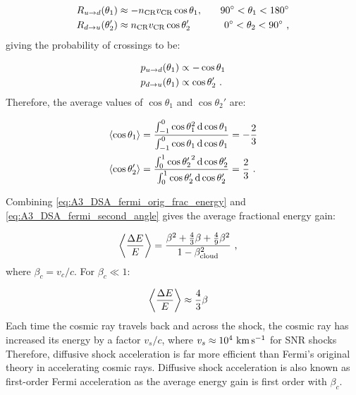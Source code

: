 \begin{alignat}{2}
    R_{u\rightarrow d}\qty(\theta_1)&\approx-n_\text{CR}v_\text{CR}\cos\theta_1,\quad &\ang{90}<\theta_1<\ang{180} \label{eq:ASA_DSA_rate_ud} \\
    R_{d\rightarrow u}\qty(\theta_2')&\approx n_\text{CR}v_\text{CR}\cos\theta_2'\quad&\ang{0}<\theta_2<\ang{90} \text{ ,}
\end{alignat}
\noindent giving the probability of crossings to be:

\begin{equation}
    \begin{aligned}
        p_{u\rightarrow d}\qty(\theta_1)&\propto -\cos\theta_1 \\
        p_{d\rightarrow u}\qty(\theta_1)&\propto \cos\theta_2'  \text{ .}
    \end{aligned}
\end{equation}
\noindent Therefore, the average values of $\cos\theta_1$ and $\cos\theta_2'$ are:

\begin{equation}
    \begin{aligned}
    \left\langle \cos\theta_1 \right\rangle&=\frac{\int_{-1}^{0} \cos\theta_1^2\dd{\cos\theta_1}}{\int_{-1}^{0}\cos\theta_1 \dd{\cos\theta_1}}=-\frac{2}{3} \\
    \left\langle \cos\theta_2' \right\rangle&=\frac{\int_{0}^{1} {\cos\theta_2'}^2\dd{\cos\theta_2'}}{\int_{0}^{1}\cos\theta_2' \dd{\cos\theta_2'}}=\frac{2}{3}\text{ .}
    \end{aligned} \label{eq:A3_DSA_fermi_second_angle}
\end{equation}

\noindent Combining \autoref{eq:A3_DSA_fermi_orig_frac_energy} and \autoref{eq:A3_DSA_fermi_second_angle} gives the average fractional energy gain:

\begin{equation}
    \begin{aligned}
    \left\langle \frac{\Delta E}{E} \right\rangle
	&=\frac{\beta^2+\frac{4}{3}\beta+\frac{4}{9}\beta^2}{1-\beta_\text{cloud}^2}\text{ ,}
    \end{aligned} 
\end{equation}
\noindent where $\beta_c=v_c/c$. For $\beta_c\ll 1$:

\begin{equation}
    \begin{aligned}
    \left\langle \frac{\Delta E}{E} \right\rangle
	&\approx \frac{4}{3}\beta 
    \end{aligned} 
\end{equation}
\noindent Each time the cosmic ray travels back and across the shock, the cosmic ray has increased its energy by a factor $v_s/c$, where $v_s\approx 10^4~\si{\kilo\meter\per\second}$ for SNR shocks Therefore, diffusive shock acceleration is far more efficient than Fermi's original theory in accelerating cosmic rays.  Diffusive shock acceleration is also known as first-order Fermi acceleration as the average energy gain is first order with $\beta_c$. 

